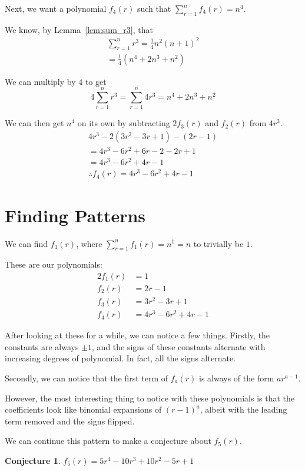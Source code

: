 \documentclass[a4paper]{article}
\newcommand{\sn}{\sum\limits_{r=1}^{n}}
\newcommand{\oo}[1]{\frac{1}{#1}}
\newtheorem{conjecture}{Conjecture}
\begin{document}
Next, we want a polynomial $f_4(r)$ such that $\sn f_4(r) = n^4$.

We know, by Lemma~\ref{lem:sum_r3}, that
\begin{gather*}
\sn r^3 = \oo{4}n^2(n + 1)^2\\
= \oo{4}\left(n^4 + 2n^3 + n^2\right)
\end{gather*}

We can multiply by $4$ to get $$4 \sn r^3 = \sn 4r^3 = n^4 + 2n^3 + n^2$$

We can then get $n^4$ on its own by subtracting $2f_3(r)$ and $f_2(r)$ from $4r^3$.
\begin{gather*}
4r^3 - 2\left(3r^2 - 3r + 1\right) - (2r - 1)\\
= 4r^3 - 6r^2 + 6r - 2 - 2r + 1\\
= 4r^3 - 6r^2 + 4r - 1\\
\therefore f_4(r) = 4r^3 - 6r^2 + 4r - 1
\end{gather*}

\section{Finding Patterns}

We can find $f_1(r)$, where $\sn f_1(r) = n^1 = n$ to trivially be $1$.

These are our polynomials:
\begin{alignat*}{2}
f_1(r) &= 1\\[0.5em]
f_2(r) &= 2r - 1\\[0.5em]
f_3(r) &= 3r^2 - 3r + 1\\[0.5em]
f_4(r) &= 4r^3 - 6r^2 + 4r - 1
\end{alignat*}

After looking at these for a while, we can notice a few things. Firstly, the constants are always $\pm 1$, and the signs of these constants alternate with increasing degrees of polynomial. In fact, all the signs alternate.

Secondly, we can notice that the first term of $f_a(r)$ is always of the form $ar^{a-1}$.

However, the most interesting thing to notice with these polynomials is that the coefficients look like binomial expansions of $(r-1)^a$, albeit with the leading term removed and the signs flipped.

We can continue this pattern to make a conjecture about $f_5(r)$.
\begin{conjecture}
$f_5(r) = 5r^4 - 10r^3 + 10r^2 - 5r + 1$
\label{conj:f5}
\end{conjecture}
\end{document}
